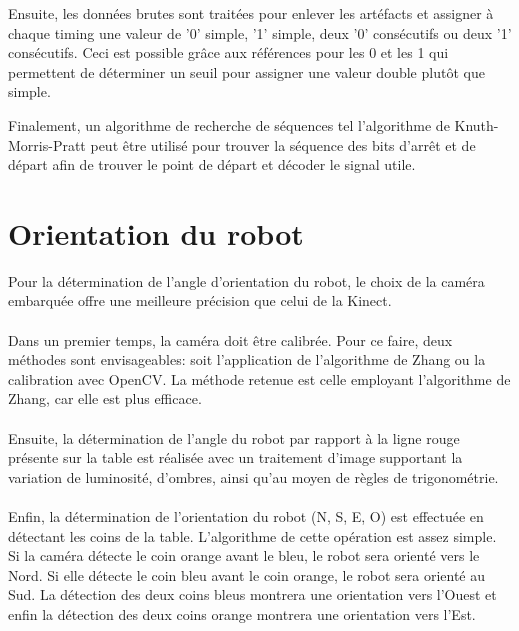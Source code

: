 Ensuite, les données brutes sont traitées pour enlever les artéfacts et assigner à chaque timing une valeur de '0' simple, '1' simple, deux '0' consécutifs ou deux '1' consécutifs. Ceci est possible grâce aux références pour les 0 et les 1 qui permettent de déterminer un seuil pour assigner une valeur double plutôt que simple.

Finalement, un algorithme de recherche de séquences tel l'algorithme de Knuth-Morris-Pratt peut être utilisé pour trouver la séquence des bits d'arrêt et de départ afin de trouver le point de départ et décoder le signal utile.

\section{Orientation du robot}

Pour la détermination de l'angle d’orientation du robot, le choix de la caméra embarquée offre une meilleure précision que celui de la Kinect. 

\paragraph{}Dans un premier temps, la caméra doit être calibrée. Pour ce faire, deux méthodes sont envisageables: soit l’application de l’algorithme de Zhang ou la calibration avec OpenCV. La méthode retenue est celle employant l'algorithme de Zhang, car elle est plus efficace. 

\paragraph{}Ensuite, la détermination de l’angle du robot par rapport à la ligne rouge présente sur la table est réalisée avec un traitement d’image supportant la variation de luminosité, d’ombres, ainsi qu'au moyen de règles de trigonométrie.

\paragraph{}Enfin, la détermination de l’orientation du robot (N, S, E, O) est effectuée en détectant les coins de la table. 
L’algorithme de cette opération est assez simple. Si la caméra détecte le coin orange avant le bleu, le robot sera orienté vers le Nord. Si elle détecte le coin bleu avant le coin orange, le robot sera orienté au Sud. La détection des deux coins bleus montrera une orientation vers l’Ouest et enfin la détection des deux coins orange montrera une orientation vers l’Est.

